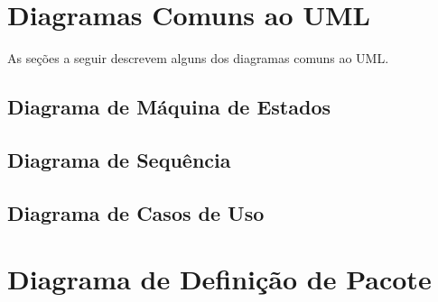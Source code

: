 \section{Diagramas Comuns ao UML}
As seções a seguir descrevem alguns dos diagramas comuns ao UML.

\subsection{Diagrama de Máquina de Estados}


\subsection{Diagrama de Sequência}


\subsection{Diagrama de Casos de Uso}


\section{Diagrama de Definição de Pacote}

